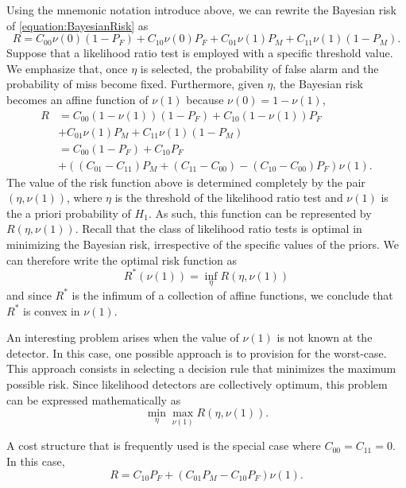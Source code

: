 Using the mnemonic notation introduce above, we can rewrite the Bayesian risk of \eqref{equation:BayesianRisk} as
\begin{equation*}
R = C_{00} \nu(0) (1 - P_F) + C_{10} \nu(0) P_F
+ C_{01} \nu(1) P_M + C_{11} \nu(1) (1 - P_M) .
\end{equation*}
Suppose that a likelihood ratio test is employed with a specific threshold value.
We emphasize that, once $\eta$ is selected, the probability of false alarm and the probability of miss become fixed.
Furthermore, given $\eta$, the Bayesian risk becomes an affine function of $\nu(1)$ because $\nu(0) = 1 - \nu(1)$,
\begin{equation*}
\begin{split}
R &= C_{00} (1 - \nu(1)) (1 - P_F) + C_{10} (1 - \nu(1)) P_F \\
&+ C_{01} \nu(1) P_M + C_{11} \nu(1) (1 - P_M) \\
&= C_{00} (1 - P_F) + C_{10} P_F \\
&+ \left( (C_{01} - C_{11}) P_M + (C_{11} - C_{00})
- (C_{10} - C_{00}) P_F \right) \nu(1) .
\end{split}
\end{equation*}
The value of the risk function above is determined completely by the pair $(\eta, \nu(1))$, where $\eta$ is the threshold of the likelihood ratio test and $\nu(1)$ is the a priori probability of $H_1$.
As such, this function can be represented by $R(\eta, \nu(1))$.
Recall that the class of likelihood ratio tests is optimal in minimizing the Bayesian risk, irrespective of the specific values of the priors.
We can therefore write the optimal risk function as
\begin{equation*}
R^* (\nu(1)) = \inf_{\eta} R(\eta, \nu(1))
\end{equation*}
and since $R^*$ is the infimum of a collection of affine functions, we conclude that $R^*$ is convex in $\nu(1)$.

An interesting problem arises when the value of $\nu(1)$ is not known at the detector.
In this case, one possible approach is to provision for the worst-case.
This approach consists in selecting a decision rule that minimizes the maximum possible risk.
Since likelihood detectors are collectively optimum, this problem can be expressed mathematically as
\begin{equation*}
\min_{\eta} \max_{\nu(1)} R(\eta, \nu(1)) .
\end{equation*}

A cost structure that is frequently used is the special case where $C_{00} = C_{11} = 0$.
In this case,
\begin{equation*}
R = C_{10} P_F + ( C_{01} P_M - C_{10} P_F ) \nu(1) .
\end{equation*}


